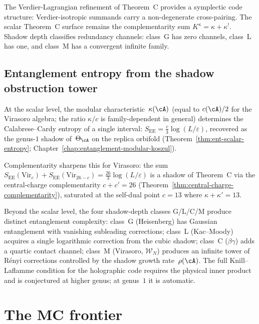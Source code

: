 The Verdier-Lagrangian refinement of Theorem~C provides a symplectic code structure: Verdier-isotropic summands carry a non-degenerate cross-pairing. The scalar Theorem~C surface remains the complementarity sum $K^\kappa=\kappa+\kappa^!$. Shadow depth classifies redundancy channels: class~G has zero channels, class~L has one, and class~M has a convergent infinite family.

\subsection{Entanglement entropy from the shadow obstruction tower}

At the scalar level, the modular characteristic~$\kappa(\cA)$ (equal to $c(\cA)/2$ for the Virasoro algebra; the ratio $\kappa/c$ is family-dependent in general) determines the Calabrese--Cardy entropy of a single interval:
$S_{\mathrm{EE}} = \tfrac{c}{3}\log(L/\varepsilon)$, recovered as the genus-$1$ shadow of~$\Theta_\cA$ on the replica orbifold (Theorem~\ref{thm:ent-scalar-entropy}; Chapter~\ref{chap:entanglement-modular-koszul}).

Complementarity sharpens this for Virasoro: the sum $S_{\mathrm{EE}}(\mathrm{Vir}_c) + S_{\mathrm{EE}}(\mathrm{Vir}_{26-c}) = \tfrac{26}{3}\log(L/\varepsilon)$ is a shadow of Theorem~C via the central-charge complementarity $c + c' = 26$ (Theorem~\ref{thm:central-charge-complementarity}), saturated at the self-dual point $c = 13$ where $\kappa + \kappa' = 13$.

Beyond the scalar level, the four shadow-depth classes G/L/C/M produce distinct entanglement complexity: class~G (Heisenberg) has Gaussian entanglement with vanishing subleading corrections; class~L (Kac--Moody) acquires a single logarithmic correction from the cubic shadow; class~C ($\beta\gamma$) adds a quartic contact channel; class~M (Virasoro, $\mathcal{W}_N$) produces an infinite tower of R\'enyi corrections controlled by the shadow growth rate~$\rho(\cA)$. The full Knill--Laflamme condition for the holographic code requires the physical inner product and is conjectured at higher genus; at genus~$1$ it is automatic.

\section{The MC frontier}
\label{sec:mc-frontier-intro}

